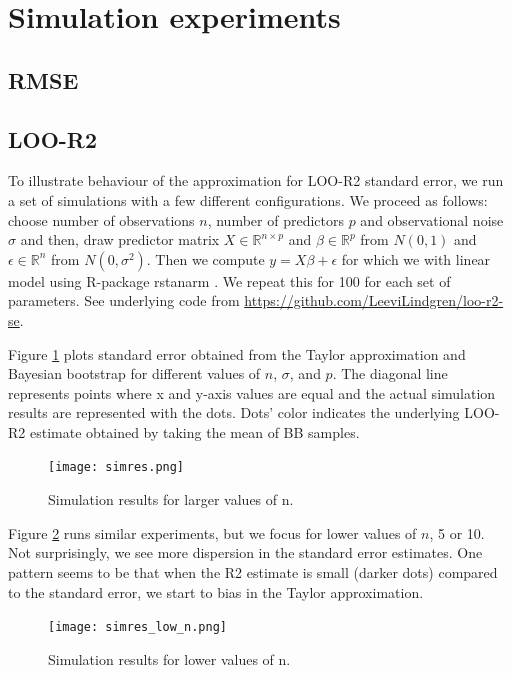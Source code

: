 \documentclass{article}
\begin{document}
\section{Simulation experiments}
\subsection{RMSE}



\subsection{LOO-R2}
To illustrate behaviour of the approximation for LOO-R2 standard error, we run a set of simulations with a few different configurations. We proceed as follows: choose number of observations $n$, number of predictors $p$ and observational noise $\sigma$ and then, draw predictor matrix $X \in \mathbb{R}^{n \times p}$ and $\beta \in \mathbb{R}^{p}$ from $N(0, 1)$ and  $\epsilon \in \mathbb{R}^{n}$ from $N(0, \sigma^2)$. Then we compute $y = X \beta + \epsilon$ for which we with linear model using R-package rstanarm \citep{rstanarm}. We repeat this for 100 for each set of parameters. See underlying code from \url{https://github.com/LeeviLindgren/loo-r2-se}.

Figure \ref{fig:simres} plots standard error obtained from the Taylor approximation and Bayesian bootstrap for different values of $n$, $\sigma$, and $p$. The diagonal line represents points where x and y-axis values are equal and the actual simulation results are represented with the dots. Dots' color indicates the underlying LOO-R2 estimate obtained by taking the mean of BB samples.
\begin{figure}
    \centering
    \texttt{[image: simres.png]}
    \caption{ Simulation results for larger values of n.}
    \label{fig:simres}
\end{figure}

Figure \ref{fig:simres_low_n} runs similar experiments, but we focus for lower values of $n$, 5 or 10. Not surprisingly, we see more dispersion in the standard error estimates. One pattern seems to be that when the R2 estimate is small (darker dots) compared to the standard error, we start to bias in the Taylor approximation.

\begin{figure}
    \centering
    \texttt{[image: simres\_low\_n.png]}
    \caption{ Simulation results for lower values of n.}
    \label{fig:simres_low_n}
\end{figure}
\end{document}
